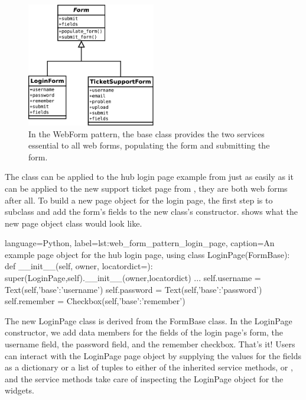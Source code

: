 \begin{figure}[tbh]
  \centering
  \includegraphics[width=0.50\textwidth]
    {../../diagrams/webform_pattern.png}
  \caption{ In the WebForm pattern, the  base class
            provides the two services essential to all web forms,
            populating the form and submitting the form. }
  \label{fig:webform_pattern_class_diagram}
\end{figure}

The  class can be applied to the hub login page example from
 just as easily as it can
be applied to the new support ticket page from
, they are both web forms after
all.  To build a new page object for the login page, the first step is to
subclass  and add the form's fields to the new class's
constructor.   shows what the new
page object class would look like.

\begin{xcode}{%
  language=Python,%
  label=lst:web_form_pattern_login_page,%
  caption={An example page object for the hub login page, using }%
}
class LoginPage(FormBase):
    def __init__(self, owner, locatordict={}):
        super(LoginPage,self).__init__(owner,locatordict)
        ...
        self.username = Text(self,{'base':'username'})
        self.password = Text(self,{'base':'password'})
        self.remember = Checkbox(self,{'base':'remember'})
\end{xcode}

The new LoginPage class is derived from the FormBase class.  In the LoginPage
constructor, we add data members for the fields of the login page's form, the
username field, the password field, and the remember checkbox. That's it!
Users can interact with the LoginPage page object by supplying the values for
the fields as a dictionary or a list of tuples to either of the inherited
service methods,  or , and
the service methods take care of inspecting the LoginPage object for the
widgets.


